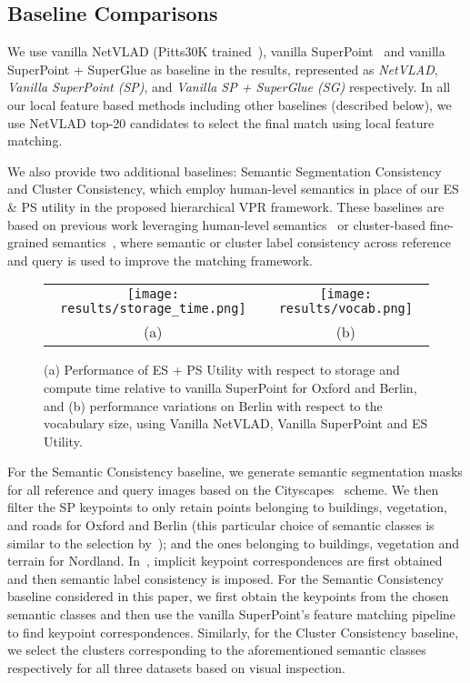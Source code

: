 \documentclass[letterpaper, 10 pt, conference]{ieeeconf}  \fi
\begin{document}
\subsection{Baseline Comparisons}
\label{sec:Details}
We use vanilla NetVLAD (Pitts30K trained~\cite{arandjelovic2016netvlad}), vanilla SuperPoint~\cite{detone2018superpoint} and vanilla SuperPoint + SuperGlue as baseline in the results, represented as \textit{NetVLAD}, \textit{Vanilla SuperPoint (SP)}, and \textit{Vanilla SP + SuperGlue (SG)} respectively. In all our local feature based methods including other baselines (described below), we use NetVLAD top-20 candidates to select the final match using local feature matching.

We also provide two additional baselines: Semantic Segmentation Consistency and Cluster Consistency, which employ human-level semantics in place of our ES \& PS utility in the proposed hierarchical VPR framework. These baselines are based on previous work leveraging human-level semantics~\cite{naseer2017semantics,garg2018lost,gawel2018x} or cluster-based fine-grained semantics~\cite{larsson2019fine}, where semantic or cluster label consistency across reference and query is used to improve the matching framework.


\begin{figure}
\centering
\begin{tabular}{cc}
\texttt{[image: results/storage\_time.png]}
&
\texttt{[image: results/vocab.png]}
\\
(a) & (b) \\
\end{tabular}
\caption{(a) Performance of ES + PS Utility with respect to storage and compute time relative to vanilla SuperPoint for Oxford and Berlin, and (b) performance variations on Berlin with respect to the vocabulary size, using Vanilla NetVLAD, Vanilla SuperPoint and ES Utility.}
\label{fig:StorageT_Vocab}
\end{figure}


For the Semantic Consistency baseline, we generate semantic segmentation masks for all reference and query images based on the Cityscapes~\cite{cordts2016cityscapes} scheme. We then filter the SP keypoints to only retain points belonging to buildings, vegetation, and roads for Oxford and Berlin (this particular choice of semantic classes is similar to the selection by~\cite{gawel2018x,garg2018lost}); and the ones belonging to buildings, vegetation and terrain for Nordland. In~\cite{garg2018lost}, implicit keypoint correspondences are first obtained and then semantic label consistency is imposed. For the Semantic Consistency baseline considered in this paper, we first obtain the keypoints from the chosen semantic classes and then use the vanilla SuperPoint's feature matching pipeline to find keypoint correspondences. Similarly, for the Cluster Consistency baseline, we select the clusters corresponding to the aforementioned semantic classes respectively for all three datasets based on visual inspection.
\end{document}
